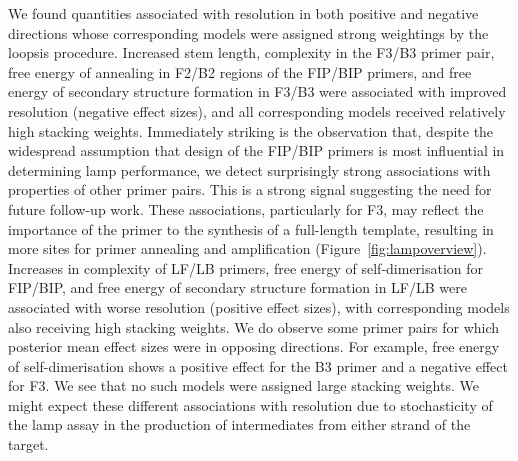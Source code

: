 \documentclass[../thesis.tex]{subfiles}
\begin{document}
We found quantities associated with resolution in both positive and negative directions whose corresponding models were assigned strong weightings by the \gls{loopsis} procedure. Increased stem length, complexity in the F3/B3 primer pair, free energy of annealing in F2/B2 regions of the FIP/BIP primers, and free energy of secondary structure formation in F3/B3 were associated with improved resolution (negative effect sizes), and all corresponding models received relatively high stacking weights.
Immediately striking is the observation that, despite the widespread assumption that design of the FIP/BIP primers is most influential in determining \gls{lamp} performance, we detect surprisingly strong associations with properties of other primer pairs. This is a strong signal suggesting the need for future follow-up work.
These associations, particularly for F3, may reflect the importance of the primer to the synthesis of a full-length template, resulting in more sites for primer annealing and amplification (Figure~\ref{fig:lampoverview}). Increases in complexity of LF/LB primers, free energy of self-dimerisation for FIP/BIP, and free energy of secondary structure formation in LF/LB were associated with worse resolution (positive effect sizes), with corresponding models also receiving high stacking weights. We do observe some primer pairs for which posterior mean effect sizes were in opposing directions. For example, free energy of self-dimerisation shows a positive effect for the B3 primer and a negative effect for F3. We see that no such models were assigned large stacking weights. We might expect these different associations with resolution due to stochasticity of the \gls{lamp} assay in the production of intermediates from either strand of the target.
\end{document}

